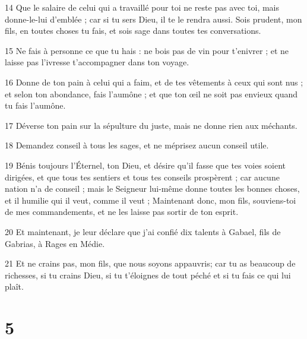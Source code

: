 \par 14 Que le salaire de celui qui a travaillé pour toi ne reste pas avec toi, mais donne-le-lui d'emblée ; car si tu sers Dieu, il te le rendra aussi. Sois prudent, mon fils, en toutes choses tu fais, et sois sage dans toutes tes conversations.
\par 15 Ne fais à personne ce que tu hais : ne bois pas de vin pour t'enivrer ; et ne laisse pas l'ivresse t'accompagner dans ton voyage.
\par 16 Donne de ton pain à celui qui a faim, et de tes vêtements à ceux qui sont nus ; et selon ton abondance, fais l'aumône ; et que ton œil ne soit pas envieux quand tu fais l'aumône.
\par 17 Déverse ton pain sur la sépulture du juste, mais ne donne rien aux méchants.
\par 18 Demandez conseil à tous les sages, et ne méprisez aucun conseil utile.
\par 19 Bénis toujours l'Éternel, ton Dieu, et désire qu'il fasse que tes voies soient dirigées, et que tous tes sentiers et tous tes conseils prospèrent ; car aucune nation n'a de conseil ; mais le Seigneur lui-même donne toutes les bonnes choses, et il humilie qui il veut, comme il veut ; Maintenant donc, mon fils, souviens-toi de mes commandements, et ne les laisse pas sortir de ton esprit.
\par 20 Et maintenant, je leur déclare que j'ai confié dix talents à Gabael, fils de Gabrias, à Rages en Médie.
\par 21 Et ne crains pas, mon fils, que nous soyons appauvris; car tu as beaucoup de richesses, si tu crains Dieu, si tu t'éloignes de tout péché et si tu fais ce qui lui plaît.

\chapter{5}

